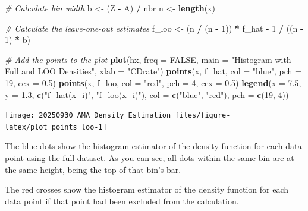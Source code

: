 \documentclass[
]{article}
\newenvironment{Shaded}{\begin{snugshade}}{\end{snugshade}}
\newcommand{\AttributeTok}[1]{\textcolor[rgb]{0.13,0.29,0.53}{#1}}
\newcommand{\CommentTok}[1]{\textcolor[rgb]{0.56,0.35,0.01}{\textit{#1}}}
\newcommand{\ConstantTok}[1]{\textcolor[rgb]{0.56,0.35,0.01}{#1}}
\newcommand{\DecValTok}[1]{\textcolor[rgb]{0.00,0.00,0.81}{#1}}
\newcommand{\FloatTok}[1]{\textcolor[rgb]{0.00,0.00,0.81}{#1}}
\newcommand{\FunctionTok}[1]{\textcolor[rgb]{0.13,0.29,0.53}{\textbf{#1}}}
\newcommand{\NormalTok}[1]{#1}
\newcommand{\OtherTok}[1]{\textcolor[rgb]{0.56,0.35,0.01}{#1}}
\newcommand{\SpecialCharTok}[1]{\textcolor[rgb]{0.81,0.36,0.00}{\textbf{#1}}}
\newcommand{\StringTok}[1]{\textcolor[rgb]{0.31,0.60,0.02}{#1}}
\begin{document}
\begin{Shaded}
\begin{Highlighting}[]
\CommentTok{\# Calculate bin width}
\NormalTok{b }\OtherTok{\textless{}{-}}\NormalTok{ (Z }\SpecialCharTok{{-}}\NormalTok{ A) }\SpecialCharTok{/}\NormalTok{ nbr}
\NormalTok{n }\OtherTok{\textless{}{-}} \FunctionTok{length}\NormalTok{(x)}

\CommentTok{\# Calculate the leave{-}one{-}out estimates}
\NormalTok{f\_loo }\OtherTok{\textless{}{-}}\NormalTok{ (n }\SpecialCharTok{/}\NormalTok{ (n }\SpecialCharTok{{-}} \DecValTok{1}\NormalTok{)) }\SpecialCharTok{*}\NormalTok{ f\_hat }\SpecialCharTok{{-}} \DecValTok{1} \SpecialCharTok{/}\NormalTok{ ((n }\SpecialCharTok{{-}} \DecValTok{1}\NormalTok{) }\SpecialCharTok{*}\NormalTok{ b)}

\CommentTok{\# Add the points to the plot}
\FunctionTok{plot}\NormalTok{(hx, }\AttributeTok{freq =} \ConstantTok{FALSE}\NormalTok{, }\AttributeTok{main =} \StringTok{"Histogram with Full and LOO Densities"}\NormalTok{, }\AttributeTok{xlab =} \StringTok{"CDrate"}\NormalTok{)}
\FunctionTok{points}\NormalTok{(x, f\_hat, }\AttributeTok{col =} \StringTok{"blue"}\NormalTok{, }\AttributeTok{pch =} \DecValTok{19}\NormalTok{, }\AttributeTok{cex =} \FloatTok{0.5}\NormalTok{)}
\FunctionTok{points}\NormalTok{(x, f\_loo, }\AttributeTok{col =} \StringTok{"red"}\NormalTok{, }\AttributeTok{pch =} \DecValTok{4}\NormalTok{, }\AttributeTok{cex =} \FloatTok{0.5}\NormalTok{)}
\FunctionTok{legend}\NormalTok{(}\AttributeTok{x =} \FloatTok{7.5}\NormalTok{, }\AttributeTok{y =} \FloatTok{1.3}\NormalTok{, }\FunctionTok{c}\NormalTok{(}\StringTok{"f\_hat(x\_i)"}\NormalTok{, }\StringTok{"f\_loo(x\_i)"}\NormalTok{), }\AttributeTok{col =} \FunctionTok{c}\NormalTok{(}\StringTok{"blue"}\NormalTok{, }\StringTok{"red"}\NormalTok{), }\AttributeTok{pch =} \FunctionTok{c}\NormalTok{(}\DecValTok{19}\NormalTok{, }\DecValTok{4}\NormalTok{))}
\end{Highlighting}
\end{Shaded}

\begin{center}\texttt{[image: 20250930\_AMA\_Density\_Estimation\_files/figure-latex/plot\_points\_loo-1]} \end{center}

The blue dots show the histogram estimator of the density function for
each data point using the full dataset. As you can see, all dots within
the same bin are at the same height, being the top of that bin's bar.

The red crosses show the histogram estimator of the density function for
each data point if that point had been excluded from the calculation.
\end{document}
